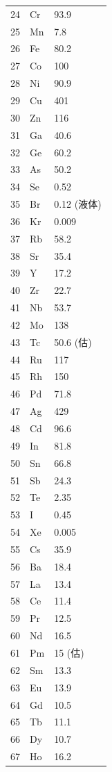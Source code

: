 \documentclass[12pt,a4paper]{article}
\begin{document}
\begin{longtable}{p{0.6cm}p{1.2cm}p{1.5cm}}
		24 & Cr & 93.9 \\
		25 & Mn & 7.8 \\
		26 & Fe & 80.2 \\
		27 & Co & 100 \\
		28 & Ni & 90.9 \\
		29 & Cu & 401 \\
		30 & Zn & 116 \\
		31 & Ga & 40.6 \\
		32 & Ge & 60.2 \\
		33 & As & 50.2 \\
		34 & Se & 0.52 \\
		35 & Br & 0.12 (液体) \\
		36 & Kr & 0.009 \\
		37 & Rb & 58.2 \\
		38 & Sr & 35.4 \\
		39 & Y  & 17.2 \\
		40 & Zr & 22.7 \\
		41 & Nb & 53.7 \\
		42 & Mo & 138 \\
		43 & Tc & 50.6 (估) \\
		44 & Ru & 117 \\
		45 & Rh & 150 \\
		46 & Pd & 71.8 \\
		47 & Ag & 429 \\
		48 & Cd & 96.6 \\
		49 & In & 81.8 \\
		50 & Sn & 66.8 \\
		51 & Sb & 24.3 \\
		52 & Te & 2.35 \\
		53 & I  & 0.45 \\
		54 & Xe & 0.005 \\
		55 & Cs & 35.9 \\
		56 & Ba & 18.4 \\
		57 & La & 13.4 \\
		58 & Ce & 11.4 \\
		59 & Pr & 12.5 \\
		60 & Nd & 16.5 \\
		61 & Pm & 15 (估) \\
		62 & Sm & 13.3 \\
		63 & Eu & 13.9 \\
		64 & Gd & 10.5 \\
		65 & Tb & 11.1 \\
		66 & Dy & 10.7 \\
		67 & Ho & 16.2 \\

\end{longtable}
\end{document}
